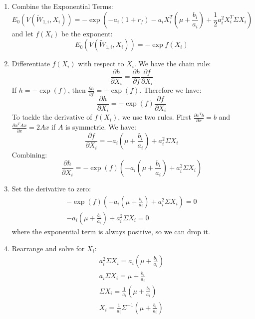 \begin{enumerate}
    \item Combine the Exponential Terms:
    \begin{equation}
        E_0(V(\tilde{W}_{1,i}, X_i)) = -\exp{(-a_i(1 + r_f)-a_iX_i^T(\mu + \frac{b_i}{a_i})+\frac{1}{2}a_i^2X_i^T\Sigma X_i)}
    \end{equation}
    and let $f(X_i)$ be the exponent:
    \begin{equation}
        E_0(V(\tilde{W}_{1,i}, X_i)) = -\exp{f(X_i)}
    \end{equation}
    \item Differentiate $f(X_i)$ with respect to $X_i$. We have the 
    chain rule:
    \begin{equation}
        \frac{\partial h}{\partial X_i} = \frac{\partial h}{\partial f} \frac{\partial f}{\partial X_i}
    \end{equation}
    If $h = - \exp{(f)}$, then $\frac{\partial h}{\partial f} = - \exp{(f)}$. 
    Therefore we have:
    \begin{equation}
        \frac{\partial h}{\partial X_i} = -\exp{(f)} \frac{\partial f}{\partial X_i}
    \end{equation}
    To tackle the derivative of $f(X_i)$, we use two rules. First $\frac{\partial x^T b}{\partial x} = b$ and
    $\frac{\partial x^T A x}{\partial x} = 2Ax$ if $A$ is symmetric. We have:
    \begin{equation}
        \frac{\partial f}{\partial X_i} = -a_i(\mu + \frac{b_i}{a_i}) + a_i^2 \Sigma X_i
    \end{equation}
    Combining:
    \begin{equation}
        \frac{\partial h}{\partial X_i} = -\exp{(f)} ( -a_i(\mu + \frac{b_i}{a_i}) + a_i^2 \Sigma X_i)
    \end{equation}
    \item Set the derivative to zero:
    \begin{equation}
        \begin{aligned}
            -\exp{(f)} ( -a_i(\mu + \frac{b_i}{a_i}) + a_i^2 \Sigma X_i) = 0 \\
            -a_i(\mu + \frac{b_i}{a_i}) + a_i^2 \Sigma X_i = 0
        \end{aligned}
    \end{equation}
    where the exponential term is always positive, so we can drop it.
    \item Rearrange and solve for $X_i$:
    \begin{equation}
        \begin{aligned}
            a_i^2 \Sigma X_i = a_i(\mu + \frac{b_i}{a_i}) \\
            a_i \Sigma X_i = \mu + \frac{b_i}{a_i} \\
            \Sigma X_i = \frac{1}{a_i}( \mu + \frac{b_i}{a_i}) \\
            X_i = \frac{1}{a_i} \Sigma^{-1}(\mu + \frac{b_i}{a_i})
        \end{aligned}
    \end{equation}
\end{enumerate}


